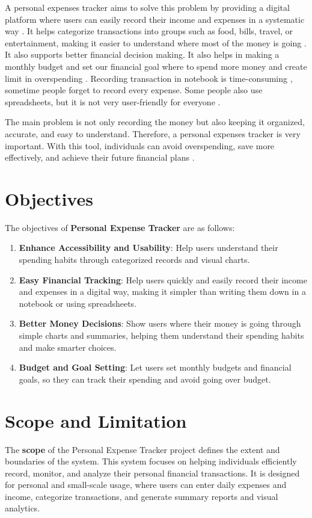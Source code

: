 \documentclass[12pt]{report}
\begin{document}
A personal expenses tracker aims to solve this problem by providing a digital platform where
users can easily record their income and expenses in a systematic way \cite{chandini2019online}.
It helps categorize transactions into groups such as food, bills, travel, or entertainment, making it
easier to understand where most of the money is going \cite{verma2024research}. It also supports better financial decision making. It also helps in making a monthly budget and set our financial goal where to spend more money
and create limit in overspending \cite{verma2024research}. Recording transaction in notebook is time-consuming ,
sometime people forget to record every expense. Some people also use spreadsheets, but it is
not very user-friendly for everyone \cite{manchanda2012expense}.

The main problem is not only recording the money but also keeping it organized, accurate, and
easy to understand. Therefore, a personal expenses tracker is very important. With this tool,
individuals can avoid overspending, save more effectively, and achieve their future financial
plans \cite{verma2024research}.

\section{Objectives}
The objectives of \textbf{Personal Expense Tracker} are as follows:

\begin{enumerate}[label=\textbullet, topsep=2pt, partopsep=0pt, itemsep=2pt, parsep=0pt]
   \item \textbf{Enhance Accessibility and Usability}: Help users understand their spending habits through categorized records and visual charts.
    \item \textbf{Easy Financial Tracking}: Help users quickly and easily record their income and expenses in a digital way, making it simpler than writing them down in a notebook or using spreadsheets.
    \item \textbf{Better Money Decisions}: Show users where their money is going through simple charts and summaries, helping them understand their spending habits and make smarter choices.
    \item \textbf{Budget and Goal Setting}: Let users set monthly budgets and financial goals, so they can track their spending and avoid going over budget.
\end{enumerate}

\section{Scope and Limitation}
\justifying
The \textbf{scope} of the Personal Expense Tracker project defines the extent and boundaries of the system. This system focuses on helping individuals efficiently record, monitor, and analyze their personal financial transactions. It is designed for personal and small-scale usage, where users can enter daily expenses and income, categorize transactions, and generate summary reports and visual analytics.
\end{document}
